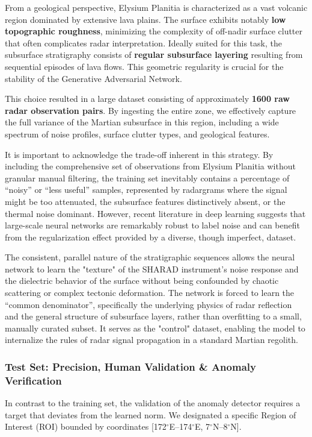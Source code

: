 From a geological perspective, Elysium Planitia is characterized as a vast volcanic region dominated by extensive lava plains.
The surface exhibits notably \textbf{low topographic roughness}, minimizing the complexity of off-nadir surface clutter that often complicates radar interpretation.
Ideally suited for this task, the subsurface stratigraphy consists of \textbf{regular subsurface layering} resulting from sequential episodes of lava flows.
This geometric regularity is crucial for the stability of the Generative Adversarial Network.

This choice resulted in a large dataset consisting of approximately \textbf{1600 raw radar observation pairs}.
By ingesting the entire zone, we effectively capture the full variance of the Martian subsurface in this region, including a wide spectrum of noise profiles, surface clutter types, and geological features.

It is important to acknowledge the trade-off inherent in this strategy.
By including the comprehensive set of observations from Elysium Planitia without granular manual filtering, the training set inevitably contains a percentage of \enquote{noisy} or \enquote{less useful} samples, represented by radargrams where the signal might be too attenuated, the subsurface features distinctively absent, or the thermal noise dominant.
However, recent literature in deep learning suggests that large-scale neural networks are remarkably robust to label noise and can benefit from the regularization effect provided by a diverse, though imperfect, dataset.

The consistent, parallel nature of the stratigraphic sequences allows the neural network to learn the "texture" of the SHARAD instrument's noise response and the dielectric behavior of the surface without being confounded by chaotic scattering or complex tectonic deformation.
The network is forced to learn the \enquote{common denominator}, specifically the underlying physics of radar reflection and the general structure of subsurface layers, rather than overfitting to a small, manually curated subset.
It serves as the "control" dataset, enabling the model to internalize the rules of radar signal propagation in a standard Martian regolith.

\subsubsection{Test Set: Precision, Human Validation \& Anomaly Verification}
In contrast to the training set, the validation of the anomaly detector requires a target that deviates from the learned norm.
We designated a specific Region of Interest (ROI) bounded by coordinates [172$^{\circ}$E--174$^{\circ}$E, 7$^{\circ}$N--8$^{\circ}$N].

